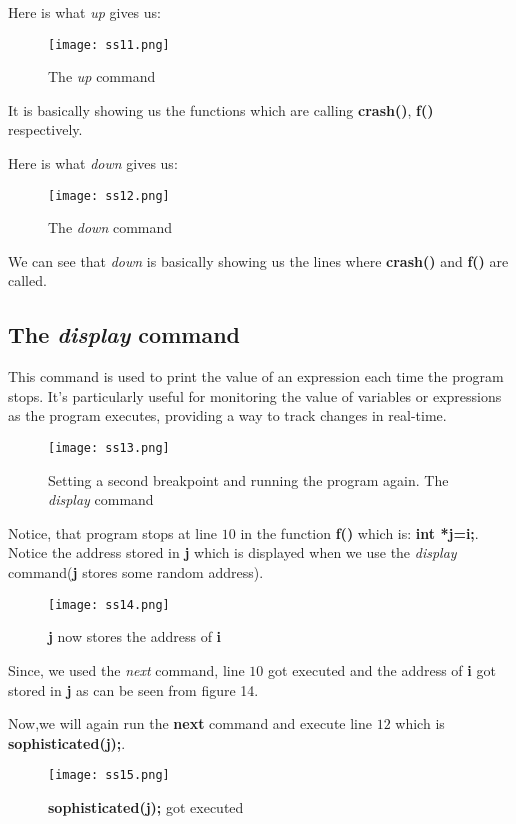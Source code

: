 \documentclass{article}
\makeatletter
\renewcommand\paragraph{\@startsection{paragraph}{4}{\z@}{-3.25ex \@plus -1ex \@minus -.2ex}{1.5ex \@plus .2ex}{\normalfont\normalsize\bfseries}}
\makeatother
\begin{document}
Here is what \textit{up} gives us:
\begin{figure}[h]
\centering
\texttt{[image: ss11.png]}
\caption{The \textit{up} command}
\end{figure}

It is basically showing us the functions which are calling \textbf{crash()}, \textbf{f()} respectively.

Here is what \textit{down} gives us:
\begin{figure}[h]
\centering
\texttt{[image: ss12.png]}
\caption{The \textit{down} command}
\end{figure}

We can see that \textit{down} is basically showing us the lines where \textbf{crash()} and \textbf{f()} are called.

\newpage
\subsection{The \textit{display} command}
\paragraph{}
This command is used to print the value of an expression each time the program stops. It's particularly useful for monitoring the value of variables or expressions as the program executes, providing a way to track changes in real-time.

\begin{figure}[h]
\centering
\texttt{[image: ss13.png]}
\caption{Setting a second breakpoint and running the program again. The \textit{display} command}
\end{figure}

Notice, that program stops at line $10$ in the function \textbf{f()} which is: \textbf{int *j=i;}. Notice the address stored in \textbf{j} which is displayed when we use the \textit{display} command(\textbf{j} stores some random address).

\begin{figure}[h]
\centering
\texttt{[image: ss14.png]}
\caption{\textbf{j} now stores the address of \textbf{i}}
\end{figure}

Since, we used the \textit{next} command, line $10$ got executed and the address of \textbf{i} got stored in \textbf{j} as can be seen from figure 14.

\newpage
Now,we will again run the \textbf{next} command and execute line $12$ which is \textbf{sophisticated(j);}.
\begin{figure}[h]
\centering
\texttt{[image: ss15.png]}
\caption{\textbf{sophisticated(j);} got executed}
\end{figure}
\end{document}

